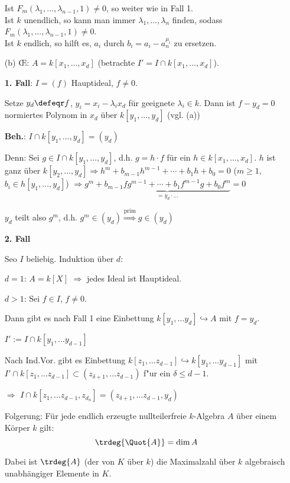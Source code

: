\begin{Bew}
\begin{enumerate}
Ist $F_m(\lambda_1,\ldots, \lambda_{n-1},1)\neq 0$, so weiter wie in Fall 1.\\
Ist $k$ unendlich, so kann man immer $\lambda_1,\ldots,\lambda_n$ finden, sodass
$F_m(\lambda_1,\ldots,\lambda_{n-1},1)\neq 0$. \\
Ist $k$ endlich, so hilft es, $a_i$ durch $b_i=a_i-a_n^{\mu_i}$ zu ersetzen.

\item[(b)] \OE: $A=k[x_1,\ldots,x_d]$ (betrachte $I'=I\cap k[x_1,\ldots,x_d]$).

\textbf{1. Fall}: $I=(f)$ Hauptideal, $f\neq 0$.

Setze $y_d\defeqr f$, $y_i=x_i-\lambda_ix_d$ f\"ur geeignete $\lambda_i\in k$.
Dann ist $f-y_d=0$ normiertes Polynom in $x_d$ \"uber $k[y_1,\ldots,y_d]$ (vgl. (a))

\textbf{Beh.}: $I\cap k[y_1,\ldots, y_d]=(y_d)$

Denn: Sei $g\in I\cap k[y_1,\ldots, y_d]$, d.h. $g=h\cdot f $ f\"ur ein $h\in k[x_1,\ldots,x_d]$.
$h$ ist ganz \"uber $k[y_2,\ldots, y_d]
\Rightarrow h^m+b_{m-1}h^{m-1}+\cdots+b_1h+b_0=0$
($m\geq 1$, $b_i\in h[y_1,\ldots, y_d]$) $\Rightarrow g^m+\underbrace{b_{m-1}fg^{m-1}+\cdots+
b_1f^{m-1}g+b_0f^m}_{=y_d\cdot\ldots}=0$

$y_d$ teilt also $g^m$, d.h. $g^m\in (y_d)\stackrel{\text{prim}}{\Rightarrow} g\in (y_d)$

\textbf{2. Fall}

Seo $I$ beliebig. Induktion \"uber $d$:

$d=1$:	$A = k[X]$ $\Rightarrow$ jedes Ideal ist Hauptideal.

$d>1$: Sei $f \in I$, $f \neq 0$.

Dann gibt es nach Fall 1 eine Einbettung $k[y_1, \ldots y_d] \hookrightarrow A$ mit $f = y_d$.

$I' := I \cap k[y_1, \ldots y_{d-1}]$

Nach Ind.Vor. gibt es Einbettung $k[z_1, \ldots z_{d-1}] \hookrightarrow k[y_1, \ldots y_{d-1}]$ mit $I' \cap k[z_1, \ldots z_{d-1}] \subset (z_{\delta+1}, \ldots z_{d-1})$ f"ur ein $\delta \leq d-1$.

$\Rightarrow$ $I \cap k[z_1, \ldots z_{d-1}, z_{d_n}] = (z_{\delta+1}, \ldots z_{d-1}, y_d)$

Folgerung: F\"ur jede endlich erzeugte nullteilerfreie $k$-Algebra $A$ \"uber einem K\"orper $k$ gilt:
\[
\trdeg{\Quot{A}} = \dim A
\]

Dabei ist $\trdeg{A}$ (der  von $K$ \"uber $k$) die Maximalzahl \"uber $k$ algebraisch unabh\"angiger Elemente in $K$.

\end{enumerate}
\end{Bew}
